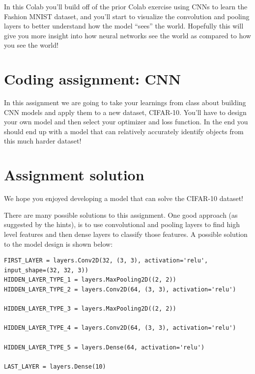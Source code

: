 In this Colab you’ll build off of the prior Colab exercise using CNNs to learn the Fashion MNIST dataset, and you’ll start to visualize the convolution and pooling layers to better understand how the model “sees” the world. Hopefully this will give you more insight into how neural networks see the world as compared to how you see the world!


\section{Coding assignment: CNN}

In this assignment we are going to take your learnings from class about building CNN models and apply them to a new dataset, CIFAR-10. You’ll have to design your own model and then select your optimizer and loss function. In the end you should end up with a model that can relatively accurately identify objects from this much harder dataset!



\section{Assignment solution}

We hope you enjoyed developing a model that can solve the CIFAR-10 dataset!

There are many possible solutions to this assignment. One good approach (as suggested by the hints), is to use convolutional and pooling layers to find high level features and then dense layers to classify those features. A possible solution to the model design is shown below:


\begin{lstlisting}
FIRST_LAYER = layers.Conv2D(32, (3, 3), activation='relu', input_shape=(32, 32, 3))
HIDDEN_LAYER_TYPE_1 = layers.MaxPooling2D((2, 2))
HIDDEN_LAYER_TYPE_2 = layers.Conv2D(64, (3, 3), activation='relu')

HIDDEN_LAYER_TYPE_3 = layers.MaxPooling2D((2, 2))

HIDDEN_LAYER_TYPE_4 = layers.Conv2D(64, (3, 3), activation='relu')

HIDDEN_LAYER_TYPE_5 = layers.Dense(64, activation='relu')

LAST_LAYER = layers.Dense(10)
\end{lstlisting}

